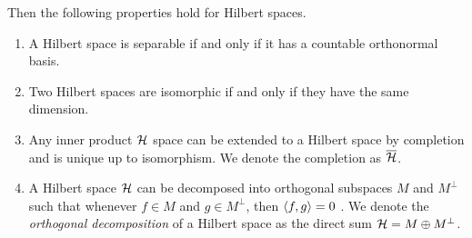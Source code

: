 \def\L{\hilbert{L}}
\def\iptH#1{\ipt{#1}_{\H}}
\def\iptL#1{\ipt{#1}_{\L}}
Then the following properties hold for Hilbert spaces.
\begin{enumerate}
    \item A Hilbert space is separable if and only if it has a countable orthonormal basis.
    \item Two Hilbert spaces are isomorphic if and only if they have the same dimension.
    \item Any inner product \(\mathcal{H}\) space can be extended to a Hilbert space by completion and is unique up to isomorphism.
    We denote the completion as \(\overline{\mathcal{H}}\).
    \item A Hilbert space \(\mathcal{H}\) can be decomposed into orthogonal subspaces \(M\) and \(M^\perp\) such that whenever \(f \in M\) and \(g \in M^\perp\), then \(\left\langle f, g \right\rangle = 0\)
    \cite{bachman1966functional}.
    We denote the \emph{orthogonal decomposition} of a Hilbert space as the direct sum \(\mathcal{H} = M \oplus M^\perp\).
\end{enumerate}